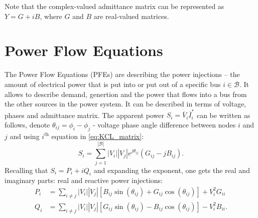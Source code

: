 Note that the complex-valued admittance matrix can be represented as $Y = G + i B$, where $G$ and $B$ are real-valued matrices.

\section{Power Flow Equations}
\label{sec:PFE}
The Power Flow Equations (PFEs) are describing the power injections -- the amount of electrical power that is put into or put out of a specific bus $i \in \mathcal{B}$. It allows to describe demand, genertion and the power that flows into a bus from the other sources in the power system.
It can be described in terms of voltage, phases and admittance matrix. 
The apparent power $S_i = \overline{V}_i \overline{I}_i^*$ can be written as follows, denote $\theta_{ij} = \phi_i - \phi_j$ - voltage phase angle difference between nodes $i$ and $j$ and using $i^{\textit{th}}$ equation in \eqref{eq:KCL_matrix}:
$$
S_i = \sum_{j=1}^{|\mathcal{B}|} |V_i||V_j| e^{j\theta_{ij}} (G_{ij} - j B_{ij}).
$$
Recalling that $S_i = P_i + iQ_i$ and expanding the exponent, one gets the real and imaginary parts: real and reactive power injections:
\begin{equation}
    \begin{aligned}
        P_i &= \sum_{i\neq j} |V_i||V_j| \left[ B_{ij} \sin(\theta_{ij}) + G_{ij} \cos(\theta_{ij}) \right] + V_i^2 G_{ii} \\ 
        Q_i &= \sum_{i\neq j} |V_i||V_j| \left[ G_{ij} \sin(\theta_{ij}) - B_{ij} \cos(\theta_{ij}) \right] - V_i^2 B_{ii}.
    \end{aligned}
    \label{eq:power_injections}
\end{equation}

